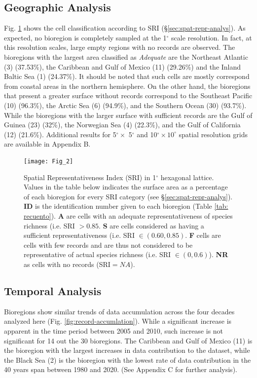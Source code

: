 \documentclass[12pt,authoryear]{elsarticle}
\begin{document}
\subsection{Geographic Analysis}

Fig. \ref{fig:cell_map} shows the cell classification according to SRI (\S \ref{sec:spat-repr-analys}). As expected, no bioregion is completely sampled at the 1$^\circ$ scale resolution. In fact, at this resolution scales, large empty regions with no records are observed. The bioregions with the largest area classified as \textit{Adequate} are the Northeast Atlantic (3) (37.53\%), the Caribbean and Gulf of Mexico (11) (29.26\%) and the Inland Baltic Sea (1) (24.37\%). It should be noted that such cells are mostly correspond from coastal areas in the northern hemisphere. On the other hand, the bioregions that present a greater surface without records correspond to the Southeast Pacific (10) (96.3\%), the Arctic Sea (6) (94.9\%), and the Southern Ocean (30) (93.7\%). While the bioregions with the larger surface with sufficient records are the Gulf of Guinea (23) (32\%), the Norwegian Sea (4) (22.3\%), and the Gulf of California (12) (21.6\%). Additional results for 5$^\circ \times$ 5$^\circ$ and  10$^\circ\times 10^\circ$ spatial resolution grids are available in Appendix B.


\begin{figure}
  \centering
  \texttt{[image: Fig\_2]}
   \caption[]{Spatial Representativeness Index (SRI) in 1$^\circ$ hexagonal lattice. Values in the table below indicates the surface area as a percentage of each bioregion for every SRI category (see \S \ref{sec:spat-repr-analys}). \textbf{ID} is the identification number given to each bioregion (Table \ref{tab: recuento}). \textbf{A} are cells with an adequate representativeness of species richness (i.e. SRI $> 0.85$. \textbf{S} are cells considered as having a sufficient representativeness (i.e. SRI $\in (0.60,0.85)$. \textbf{F} cells are cells with  few records and are thus not considered to be representative of actual species richness (i.e. SRI $\in (0,0.6)$). \textbf{NR} as cells with no records (SRI$= NA$). 
  \label{fig:cell_map}}
\end{figure}

\subsection{Temporal Analysis}
\label{sec:temporal-analysis}
Bioregions show similar trends of data accumulation across the four decades analyzed here (Fig. \ref{fig:record-accumlation}). While a significant increase is apparent in the time period between 2005 and 2010, such increase is not significant for 14 out the 30 bioregions. The Caribbean and Gulf of Mexico (11) is the bioregion with the largest increases in data contribution to the dataset, while the Black Sea (2) is the bioregion with the lowest rate of data contribution in the 40 years span between 1980 and 2020. (See  Appendix C for further analysis).
\end{document}

